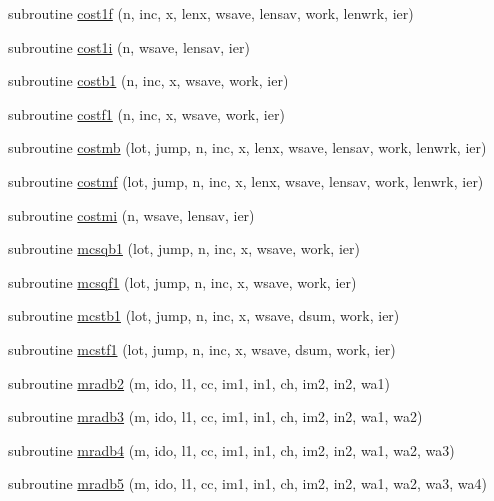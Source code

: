 \begin{DoxyCompactItemize}
subroutine \mbox{\hyperlink{namespacefftclass_ae01eaac3c675ef6c95b60a480bda63ba}{cost1f}} (n, inc, x, lenx, wsave, lensav, work, lenwrk, ier)
\item 
subroutine \mbox{\hyperlink{namespacefftclass_aa0605a45256c5ff2bfcd9229dd8854e4}{cost1i}} (n, wsave, lensav, ier)
\item 
subroutine \mbox{\hyperlink{namespacefftclass_a2769de58926e8dc80c0fa9f862de7dce}{costb1}} (n, inc, x, wsave, work, ier)
\item 
subroutine \mbox{\hyperlink{namespacefftclass_af419be9c656e387f89facc1033cf4f55}{costf1}} (n, inc, x, wsave, work, ier)
\item 
subroutine \mbox{\hyperlink{namespacefftclass_a1bb83e3c96bf08b2789acf52feef22b8}{costmb}} (lot, jump, n, inc, x, lenx, wsave, lensav, work, lenwrk, ier)
\item 
subroutine \mbox{\hyperlink{namespacefftclass_a04e4666f4382e42cf8e63ee5c44fc61a}{costmf}} (lot, jump, n, inc, x, lenx, wsave, lensav, work, lenwrk, ier)
\item 
subroutine \mbox{\hyperlink{namespacefftclass_a4e2ea9d14ac7ed425be8cb1fd1ed8ddf}{costmi}} (n, wsave, lensav, ier)
\item 
subroutine \mbox{\hyperlink{namespacefftclass_a91e23ffaebaadf2b1c22e689f69996a2}{mcsqb1}} (lot, jump, n, inc, x, wsave, work, ier)
\item 
subroutine \mbox{\hyperlink{namespacefftclass_a05d00644e8642979b2c55b7822bbfb03}{mcsqf1}} (lot, jump, n, inc, x, wsave, work, ier)
\item 
subroutine \mbox{\hyperlink{namespacefftclass_a10f96df2a58ce7f2e6ac9eaddf09588e}{mcstb1}} (lot, jump, n, inc, x, wsave, dsum, work, ier)
\item 
subroutine \mbox{\hyperlink{namespacefftclass_aac5cdc09f4e9979eb972972e1db55cb3}{mcstf1}} (lot, jump, n, inc, x, wsave, dsum, work, ier)
\item 
subroutine \mbox{\hyperlink{namespacefftclass_a39691ebdf781bf380b7ef426f4027896}{mradb2}} (m, ido, l1, cc, im1, in1, ch, im2, in2, wa1)
\item 
subroutine \mbox{\hyperlink{namespacefftclass_a493cf432cfe190657e9a56a0d452b275}{mradb3}} (m, ido, l1, cc, im1, in1, ch, im2, in2, wa1, wa2)
\item 
subroutine \mbox{\hyperlink{namespacefftclass_a5aae50728c25b5089b6b3c61d3ef27eb}{mradb4}} (m, ido, l1, cc, im1, in1, ch, im2, in2, wa1, wa2, wa3)
\item 
subroutine \mbox{\hyperlink{namespacefftclass_a69781205c1568e37470a06e001a0dae7}{mradb5}} (m, ido, l1, cc, im1, in1, ch, im2, in2, wa1, wa2, wa3, wa4)

\end{DoxyCompactItemize}
